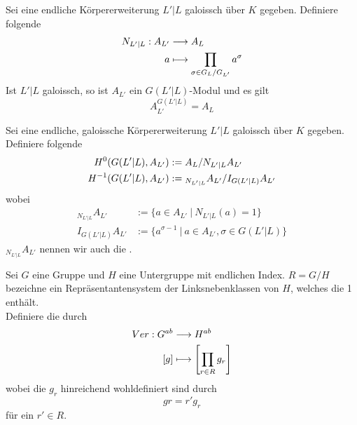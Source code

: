 Sei eine endliche Körpererweiterung $L'|L$ galoissch über $K$ gegeben. Definiere folgende 
\begin{align*}
N_{L'|L} : A_{L'} & \overset{}{\longrightarrow} A_L\\
a & \longmapsto \prod_{\sigma \in G_L/G_{L'}}a^\sigma
\end{align*}
Ist $L'|L$ galoissch, so ist $A_{L'}$ ein $G(L'|L)$-Modul und es gilt
\[ A_{L'}^{G(L'|L)}  = A_L \]

Sei eine endliche, galoissche Körpererweiterung $L'|L$ galoissch über $K$ gegeben. Definiere folgende 
\begin{align*}
H^0(G(L'|L), A_{L'} ) &:= A_L / N_{L'|L} A_{L'}\\
H^{-1} (G(L'|L) , A_{L'}) &:= {}_{N_{L'|L}}A_{L'} / I_{G(L'|L)}A_{L'}
\end{align*}
wobei
\begin{align*}
{}_{N_{L'|L}}A_{L'} &:= \{a \in A_{L'}~|~N_{L'|L}(a) = 1\}\\
I_{G(L'|L)}A_{L'} &:= \{a^{\sigma - 1}~|~a \in A_{L'}, \sigma \in G(L'|L)\}
\end{align*}
${}_{N_{L'|L}}A_{L'}$ nennen wir auch die .

Sei $G$ eine Gruppe und $H$ eine Untergruppe mit endlichen Index. $R = G/H$ bezeichne ein Repräsentantensystem der Linksnebenklassen von $H$, welches die 1 enthält.\\ Definiere die  durch
\begin{align*}
Ver : G^{ab}& \overset{}{\longrightarrow} H^{ab}\\
[g] & \longmapsto \left[ \prod_{r \in R}g_r \right]
\end{align*}
wobei die $g_r$ hinreichend wohldefiniert sind durch
\[ gr = r'g_r \]
für ein $r' \in R$.

